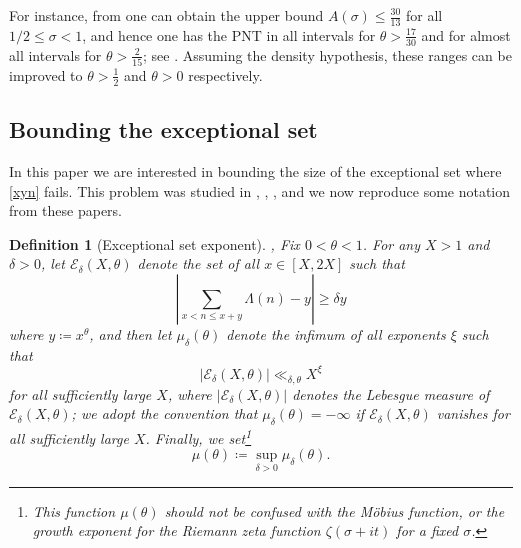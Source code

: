 \documentclass[12pt]{amsart}
\newtheorem{definition}{Definition}[section]
\begin{document}
For instance, from  one can obtain the upper bound $A(\sigma) \leq \frac{30}{13}$ for all $1/2 \leq \sigma < 1$, and hence one has the PNT in all intervals for $\theta > \frac{17}{30}$ and for almost all intervals for $\theta > \frac{2}{15}$; see \cite[Corollary 1.3, Corollary 1.4]{GuthMaynard}.  Assuming the density hypothesis, these ranges can be improved to $\theta > \frac{1}{2}$ and $\theta > 0$ respectively.

\subsection{Bounding the exceptional set}

In this paper we are interested in bounding the size of the exceptional set where \eqref{xyn} fails.  This problem was studied in \cite{baz-1}, \cite{bp}, \cite{baz-2}, and we now reproduce some notation from these papers.

\begin{definition}[Exceptional set exponent]\label{excep}\cite{bp}, \cite{baz-2}  Fix $0 < \theta < 1$.  For any $X > 1$ and $\delta > 0$, let ${\mathcal E}_\delta(X,\theta)$ denote the set of all $x \in [X,2X]$ such that
  $$ \left|\sum_{x < n \leq x+y} \Lambda(n) - y \right| \geq \delta y$$
where $y \coloneqq x^\theta$, and then let $\mu_\delta(\theta)$ denote the infimum of all exponents $\xi$ such that
$$ |{\mathcal E}_\delta(X,\theta)| \ll_{\delta,\theta} X^{\xi}$$
for all sufficiently large $X$, where $|{\mathcal E}_\delta(X,\theta)|$ denotes the Lebesgue measure of ${\mathcal E}_\delta(X,\theta)$; we adopt the convention that $\mu_\delta(\theta)=-\infty$ if ${\mathcal E}_\delta(X,\theta)$ vanishes for all sufficiently large $X$.  Finally, we set\footnote{This function $\mu(\theta)$ should not be confused with the M\"obius function, or the growth exponent for the Riemann zeta function $\zeta(\sigma+it)$ for a fixed $\sigma$.}
$$ \mu(\theta) \coloneqq \sup_{\delta > 0} \mu_\delta(\theta).$$
\end{definition}
\end{document}
